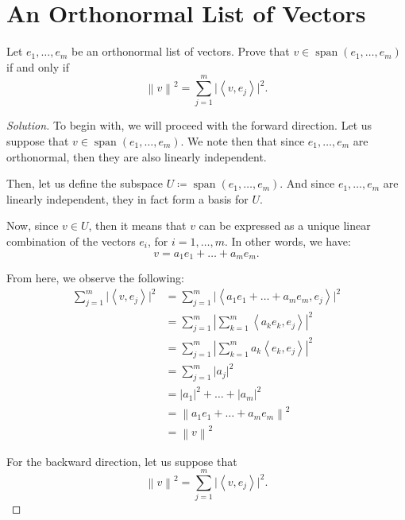 \documentclass{article}
\newenvironment{solution}{\begin{proof}[Solution]}{\end{proof}}
\newcommand{\norm}[1]{\left\lVert{#1}\right\rVert}
\DeclareMathOperator*{\vspan}{\mathrm{span}}
\newcommand{\innerproduct}[2]{\left\langle{#1}, {#2}\right\rangle}
\begin{document}
	\section{An Orthonormal List of Vectors}
	\begin{hw}
		Let $e_{1}, \ldots, e_{m}$ be an orthonormal list of vectors. Prove that $v \in \vspan(e_{1}, \ldots, e_{m})$ if and only if
		\begin{equation*}
			\norm{v}^{2} = \sum_{j=1}^{m} \lvert \innerproduct{v}{e_{j}} \rvert^{2}.
		\end{equation*}
	\end{hw}
	\begin{solution}
		To begin with, we will proceed with the forward direction. Let us suppose that $v \in \vspan(e_{1}, \ldots, e_{m})$. We note then that since $e_{1}, \ldots, e_{m}$ are orthonormal, then they are also linearly independent.
		
		Then, let us define the subspace $U \coloneq \vspan(e_{1}, \ldots, e_{m})$. And since $e_{1}, \ldots, e_{m}$ are linearly independent, they in fact form a basis for $U$.
		
		Now, since $v \in U$, then it means that $v$ can be expressed as a unique linear combination of the vectors $e_{i}$, for $i = 1, \ldots, m$. In other words, we have:
		\begin{equation*}
			v = a_{1}e_{1} + \ldots + a_{m}e_{m}.
		\end{equation*}
	
		From here, we observe the following:
		\begin{align*}
			\sum_{j=1}^{m} \lvert \innerproduct{v}{e_{j}} \rvert^{2} &= \sum_{j=1}^{m} \lvert \innerproduct{a_{1}e_{1} + \ldots + a_{m}e_{m}}{e_{j}} \rvert^{2} \\
			&= \sum_{j=1}^{m} \left\lvert \sum_{k=1}^{m} \innerproduct{a_{k}e_{k}}{e_{j}} \right\rvert^{2} \\
			&= \sum_{j=1}^{m} \left\lvert \sum_{k=1}^{m} a_{k}\innerproduct{e_{k}}{e_{j}} \right\rvert^{2} \\
			&= \sum_{j=1}^{m} \lvert a_{j} \rvert^{2} \\
			&= \lvert a_{1} \rvert^{2} + \ldots + \lvert a_{m} \rvert^{2} \\
			&=\norm{a_{1}e_{1} + \ldots + a_{m}e_{m}}^{2} \\
			&= \norm{v}^{2}
		\end{align*}
	
		For the backward direction, let us suppose that 
		\begin{equation*}
			\norm{v}^{2} = \sum_{j=1}^{m} \lvert \innerproduct{v}{e_{j}} \rvert^{2}.
		\end{equation*}
	

\end{solution}
\end{document}
